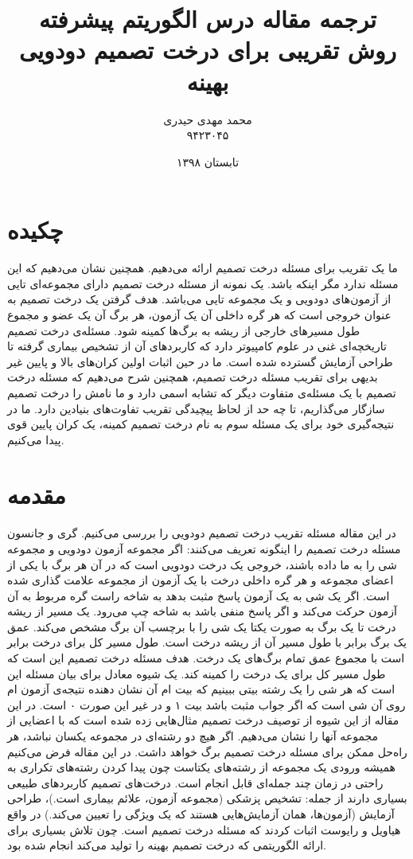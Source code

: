 \documentclass[a4paper]{article}
\title{ترجمه مقاله درس الگوریتم پیشرفته\\
روش تقریبی برای درخت تصمیم دودویی بهینه
}
\author{محمد مهدی حیدری\\۹۴۲۳۰۴۵}
\date{تابستان ۱۳۹۸}
\begin{document}
	\maketitle
	\section*{چکیده}
	ما یک تقریب
	برای مسئله درخت تصمیم ارائه می‌دهیم. همچنین نشان می‌دهیم که این مسئله
	ندارد مگر اینکه
	باشد. یک نمونه از مسئله درخت تصمیم دارای مجموعه‌ای
	تایی از آزمون‌های دودویی
	و یک مجموعه
	تایی 
	می‌باشد. هدف گرفتن یک درخت تصمیم به عنوان خروجی است که هر گره داخلی آن یک آزمون، هر برگ آن یک عضو و مجموع طول
	مسیرهای خارجی از ریشه به برگ‌ها کمینه شود. مسئله‌ی درخت تصمیم تاریخچه‌ای غنی در علوم کامپیوتر دارد که کاربردهای
	آن از تشخیص بیماری گرفته تا طراحی آزمایش گسترده شده است. ما در حین اثبات اولین کران‌های بالا و پایین غیر بدیهی 
	برای تقریب مسئله درخت تصمیم، همچنین شرح می‌دهیم که مسئله درخت تصمیم با یک مسئله‌ی متفاوت دیگر که تشابه اسمی دارد و ما نامش را درخت تصمیم سازگار می‌گذاریم، تا چه حد از لحاظ پیچیدگی تقریب تفاوت‌های بنیادین دارد. ما در نتیجه‌گیری خود برای یک مسئله سوم به نام درخت تصمیم کمینه، یک کران پایین قوی پیدا می‌کنیم.
	\section{مقدمه}
	\paragraph{}
	در این مقاله مسئله تقریب درخت تصمیم دودویی را بررسی می‌کنیم. گری و جانسون مسئله درخت تصمیم را اینگونه تعریف می‌کنند: اگر مجموعه
	آزمون دودویی 
	و مجموعه 
	شی 
	را به ما داده باشند، خروجی یک درخت دودویی است که در آن هر برگ با یکی از اعضای مجموعه 
	و هر گره داخلی درخت با یک آزمون از مجموعه 
	علامت گذاری شده است. اگر یک شی به یک آزمون پاسخ مثبت بدهد به شاخه
	راست گره مربوط به آن آزمون حرکت می‌کند و اگر پاسخ منفی باشد به شاخه چپ می‌رود. یک مسیر از ریشه درخت تا یک برگ 
	به صورت یکتا یک شی را با برچسب آن برگ مشخص می‌کند. عمق یک برگ برابر با طول مسیر آن از ریشه درخت است.
	طول مسیر کل برای درخت برابر است با مجموع عمق تمام برگ‌های یک درخت. هدف مسئله درخت تصمیم این است که طول مسیر کل
	برای یک درخت را کمینه کند. یک شیوه معادل برای بیان مسئله این است که هر شی را یک رشته 
	بیتی ببینیم که بیت 
	ام آن نشان دهنده نتیجه‌ی آزمون 
	ام روی آن شی است که اگر جواب مثبت باشد بیت ۱ و در غیر این صورت ۰ است. در این مقاله از این شیوه از توصیف درخت
	تصمیم مثال‌هایی زده شده است که با اعضایی از مجموعه
	آنها را نشان می‌دهیم.
	اگر هیچ دو رشته‌ای در مجموعه
	یکسان نباشد، هر راه‌حل ممکن برای مسئله درخت تصمیم
	برگ خواهد داشت. در این مقاله فرض می‌کنیم همیشه ورودی یک مجموعه از رشته‌های یکتاست چون پیدا کردن رشته‌های تکراری
	به راحتی در زمان چند جمله‌ای قابل انجام است. درخت‌های تصمیم کاربردهای طبیعی بسیاری دارند از جمله: تشخیص پزشکی
	(مجموعه آزمون، علائم بیماری است.)، طراحی آزمایش (آزمون‌ها، همان آزمایش‌هایی هستند که یک ویژگی را تعیین می‌کند.)
	در واقع هیاویل و رایوست اثبات کردند که مسئله درخت تصمیم 
	است. چون تلاش بسیاری برای ارائه الگوریتمی که درخت تصمیم بهینه را تولید می‌کند انجام شده بود.
\end{document}
